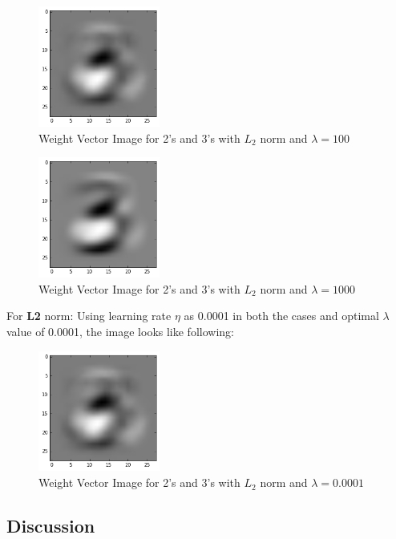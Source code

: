 \documentclass{article}
\begin{document}
\begin{figure}[h!]
    \centering
  \includegraphics[width=40mm, scale=0.5]{graphs/23Weights_l2_100.PNG}
  \caption{Weight Vector Image for 2's and 3's with $L_{2}$ norm and $\lambda = 100$}
  \label{fig:graph 5(e) l1}
\end{figure}

\begin{figure}[h!]
    \centering
  \includegraphics[width=40mm, scale=0.5]{graphs/23Weights_l2_1000.PNG}
  \caption{Weight Vector Image for 2's and 3's with $L_{2}$ norm and $\lambda = 1000$}
  \label{fig:graph 5(e) l1}
\end{figure}
\newpage
For \textbf{L2} norm: Using learning rate $\eta$ as 0.0001 in both the cases and optimal $\lambda$ value of 0.0001, the image looks like following:

\begin{figure}[h!]
    \centering
  \includegraphics[width=40mm, scale=0.5]{graphs/23WeightsImage_Regularization.PNG}
  \caption{Weight Vector Image for 2's and 3's with $L_{2}$ norm and $\lambda = 0.0001$}
  \label{fig:graph 5(e) l1}
\end{figure}


\subsection{Discussion}
\end{document}
